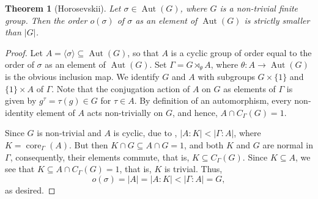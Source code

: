 \documentclass[12pt]{article}
\theoremstyle{thmstyle}
\newtheorem{theorem}{Theorem}[section]
\theoremstyle{defstyle}
\newcommand{\Aut}{\operatorname{Aut}}
\newcommand{\core}{\operatorname{core}}
\begin{document}
\begin{theorem}[Horosevskii]
    Let $\sigma\in\Aut(G)$, where $G$ is a non-trivial finite group. Then the order $o(\sigma)$ of $\sigma$ as an element of $\Aut(G)$ is strictly smaller than $|G|$.
\end{theorem}
\begin{proof}
    Let $A = \langle\sigma\rangle\subseteq\Aut(G)$, so that $A$ is a cyclic group of order equal to the order of $\sigma$ as an element of $\Aut(G)$. Set $\Gamma = G\rtimes_\theta A$, where $\theta: A\to\Aut(G)$ is the obvious inclusion map. We identify $G$ and $A$ with subgroups $G\times\{1\}$ and $\{1\}\times A$ of $\Gamma$. Note that the conjugation action of $A$ on $G$ as elements of $\Gamma$ is given by $g^\tau = \tau(g)\in G$ for $\tau\in A$. By definition of an automorphism, every non-identity element of $A$ acts non-trivially on $G$, and hence, $A\cap C_\Gamma(G) = 1$.

    Since $G$ is non-trivial and $A$ is cyclic, due to , $|A : K| < |\Gamma : A|$, where $K = \core_\Gamma(A)$. But then $K\cap G\subseteq A\cap G = 1$, and both $K$ and $G$ are normal in $\Gamma$, consequently, their elements commute, that is, $K\subseteq C_\Gamma(G)$. Since $K\subseteq A$, we see that $K\subseteq A\cap C_\Gamma(G) = 1$, that is, $K$ is trivial. Thus,
    \begin{equation*}
        o(\sigma) = |A| = |A : K| < |\Gamma : A| = G,
    \end{equation*}
    as desired.
\end{proof}
\end{document}
